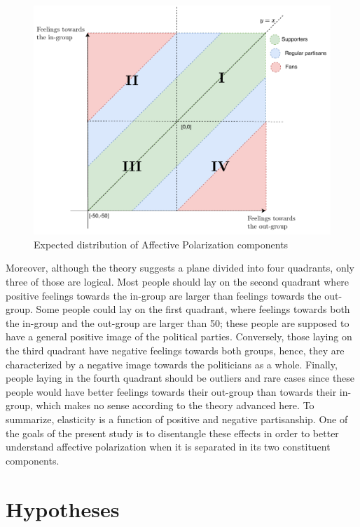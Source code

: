\documentclass[a4paper, svgnames]{article}
\begin{document}
\begin{figure}[H]
	\centering
	\includegraphics[width=\textwidth]{Figures/Expected empirics.pdf}
	\caption{Expected distribution of Affective Polarization components}
	\label{fig:empirical_expectations}
\end{figure}



Moreover, although the theory suggests a plane divided into four quadrants, only three of those are logical. Most people should lay on the second quadrant where positive feelings towards the in-group are larger than feelings towards the out-group. Some people could lay on the first quadrant, where feelings towards both the in-group and the out-group are larger than 50; these people are supposed to have a general positive image of the political parties. Conversely, those laying on the third quadrant have negative feelings towards both groups, hence, they are characterized by a negative image towards the politicians as a whole. Finally, people laying in the fourth quadrant should be outliers and rare cases since these people would have better feelings towards their out-group than towards their in-group, which makes no sense according to the theory advanced here. To summarize, elasticity is a function of positive and negative partisanship. One of the goals of the present study is to disentangle these effects in order to better understand affective polarization when it is separated in its two constituent components.

\newpage

\section{Hypotheses}
\end{document}
